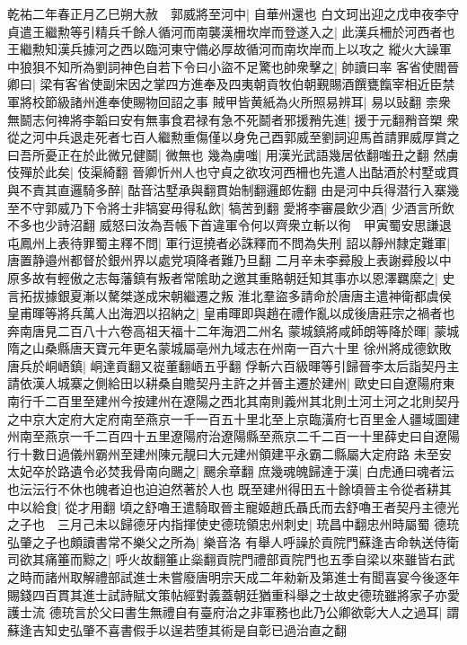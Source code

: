 乾祐二年春正月乙巳朔大赦　郭威將至河中|{
	自華州還也}
白文珂出迎之戊申夜李守貞遣王繼勲等引精兵千餘人循河而南襲漢柵坎岸而登遂入之|{
	此漢兵柵於河西者也王繼勲知漢兵據河之西以臨河東守備必厚故循河而南坎岸而上以攻之}
縱火大譟軍中狼狽不知所為劉詞神色自若下令曰小盜不足驚也帥衆擊之|{
	帥讀曰率}
客省使閻晉卿曰|{
	梁有客省使副宋因之掌四方進奉及四夷朝貢牧伯朝覲賜酒饌甕餼宰相近臣禁軍將校節級諸州進奉使賜物回詔之事}
賊甲皆黄紙為火所照易辨耳|{
	易以䜴翻}
柰衆無鬬志何禆將李韜曰安有無事食君禄有急不死鬬者邪援矟先進|{
	援于元翻矟音槊}
衆從之河中兵退走死者七百人繼勲重傷僅以身免己酉郭威至劉詞迎馬首請罪威厚賞之曰吾所憂正在於此微兄健鬬|{
	微無也}
幾為虜嗤|{
	用漢光武語幾居依翻嗤丑之翻}
然虜伎殫於此矣|{
	伎渠綺翻}
晉卿忻州人也守貞之欲攻河西柵也先遣人出酤酒於村墅或貫與不責其直邏騎多醉|{
	酤音沽墅承與翻貫始制翻邏郎佐翻}
由是河中兵得潜行入寨幾至不守郭威乃下令將士非犒宴毋得私飲|{
	犒苦到翻}
愛將李審晨飲少酒|{
	少酒言所飲不多也少詩沼翻}
威怒曰汝為吾帳下首違軍令何以齊衆立斬以徇　甲寅蜀安思謙退屯鳳州上表待罪蜀主釋不問|{
	軍行逗撓者必誅釋而不問為失刑}
詔以靜州隸定難軍|{
	唐置静邉州都督於銀州界以處党項降者難乃旦翻}
二月辛未李彛殷上表謝彛殷以中原多故有輕傲之志每藩鎮有叛者常隂助之邀其重賂朝廷知其事亦以恩澤羈縻之|{
	史言拓拔據銀夏漸以驁桀遂成宋朝繼遷之叛}
淮北羣盜多請命於唐唐主遣神衛都虞侯皇甫暉等將兵萬人出海泗以招納之|{
	皇甫暉即與趙在禮作亂以成後唐莊宗之禍者也奔南唐見二百八十六卷高祖天福十二年海泗二州名}
蒙城鎮將咸師朗等降於暉|{
	蒙城隋之山桑縣唐天寶元年更名蒙城屬亳州九域志在州南一百六十里}
徐州將成德欽敗唐兵於峒峿鎮|{
	峒達貢翻又嵸董翻峿五乎翻}
俘斬六百級暉等引歸晉李太后詣契丹主請依漢人城寨之側給田以耕桑自贍契丹主許之并晉主遷於建州|{
	歐史曰自遼陽府東南行千二百里至建州今按建州在遼陽之西北其南則義州其北則土河土河之北則契丹之中京大定府大定府南至燕京一千一百五十里北至上京臨潢府七百里金人疆域圖建州南至燕京一千二百四十五里遼陽府治遼陽縣至燕京二千二百一十里薛史曰自遼陽行十數日過儀州霸州至建州陳元靚曰大元建州領建平永霸二縣屬大定府路}
未至安太妃卒於路遺令必焚我骨南向颺之|{
	颺余章翻}
庶幾魂魄歸達于漢|{
	白虎通曰魂者沄也沄沄行不休也魄者迫也迫迫然著於人也}
既至建州得田五十餘頃晉主令從者耕其中以給食|{
	從才用翻}
頃之舒嚕王遣騎取晉主寵姬趙氏聶氏而去舒嚕王者契丹主德光之子也　三月己未以歸德牙内指揮使史德珫領忠州刺史|{
	珫昌中翻忠州時屬蜀}
德珫弘肇之子也頗讀書常不樂父之所為|{
	樂音洛}
有舉人呼譟於貢院門蘇逢吉命執送侍衛司欲其痛箠而黥之|{
	呼火故翻箠止橤翻貢院門禮部貢院門也五季自梁以來雖皆右武之時而諸州取解禮部試進士未嘗廢唐明宗天成二年勑新及第進士有聞喜宴今後逐年賜錢四百貫其進士試詩賦文策帖經對義蓋朝廷猶重科舉之士故史德珫雖將家子亦愛護士流}
德珫言於父曰書生無禮自有臺府治之非軍務也此乃公卿欲彰大人之過耳|{
	謂蘇逢吉知史弘肇不喜書假手以逞若堕其術是自彰已過治直之翻}
